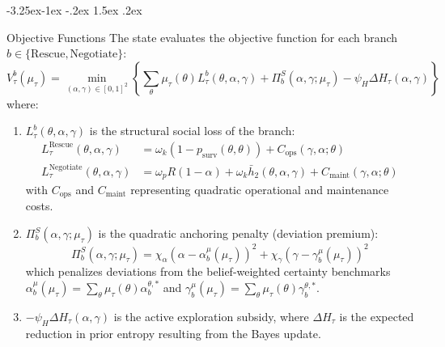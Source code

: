 \documentclass[12pt]{article}
\makeatletter
\numberwithin{equation}{section}
\numberwithin{table}{section}
\renewcommand\subsection{\@startsection{subsection}{2}{\z@}%
                                     {-3.25ex\@plus -1ex \@minus -.2ex}%
                                     {1.5ex \@plus .2ex}%
                                     {\normalfont\large\bfseries\raggedright}}
\makeatother
\begin{document}
\subsection{Objective Functions}
The state evaluates the objective function for each branch $b \in \{\text{Rescue}, \text{Negotiate}\}$:
\begin{equation}
\label{eq:state-objective}
V_\tau^b(\mu_\tau) = \min_{(\alpha,\gamma) \in [0,1]^2}
\left\{\sum_\theta \mu_\tau(\theta) L_\tau^b(\theta,\alpha,\gamma) + \Pi^S_b(\alpha,\gamma;\mu_\tau) -
\psi_H \Delta H_\tau(\alpha,\gamma)\right\}
\end{equation}
where:
\begin{enumerate}
    \item $L_\tau^b(\theta,\alpha,\gamma)$ is the structural social loss of the branch:
    \begin{align}
    L_\tau^{\text{Rescue}}(\theta,\alpha,\gamma) &= \omega_k (1 - p_{\text{surv}}(\theta,\theta)) + C_{\text{ops}}(\gamma,\alpha;\theta) \\
    L_\tau^{\text{Negotiate}}(\theta,\alpha,\gamma) &= \omega_p R (1 - \alpha) + \omega_k \bar{h}_2(\theta,\alpha,\gamma) + C_{\text{maint}}(\gamma,\alpha;\theta)
    \end{align}
    with $C_{\text{ops}}$ and $C_{\text{maint}}$ representing quadratic operational and maintenance costs.
    \item $\Pi^S_b(\alpha,\gamma;\mu_\tau)$ is the quadratic anchoring penalty (deviation premium):
    \begin{equation}
    \Pi^S_b(\alpha,\gamma;\mu_\tau) = \chi_\alpha \left(\alpha - \alpha_b^\mu(\mu_\tau)\right)^2 + \chi_\gamma \left(\gamma - \gamma_b^\mu(\mu_\tau)\right)^2
    \end{equation}
    which penalizes deviations from the belief-weighted certainty benchmarks $\alpha_b^\mu(\mu_\tau) = \sum_\theta \mu_\tau(\theta) \alpha_b^{\theta,\ast}$ and $\gamma_b^\mu(\mu_\tau) = \sum_\theta \mu_\tau(\theta) \gamma_b^{\theta,\ast}$.
    \item $-\psi_H \Delta H_\tau(\alpha,\gamma)$ is the active exploration subsidy, where $\Delta H_\tau$ is the expected reduction in prior entropy resulting from the Bayes update.
\end{enumerate}
\end{document}
